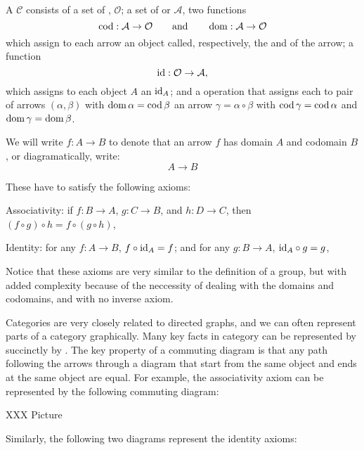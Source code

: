 \begin{definition}
  A  $\mathcal{C}$ consists of a set of
  , $\mathcal{O}$; a set of
   or  $\mathcal{A}$,
  two functions
  \[
    \operatorname{cod}: \mathcal{A} \to \mathcal{O} \qquad \text{and} \qquad \operatorname{dom}:
    \mathcal{A} \to \mathcal{O}
  \]
  which assign to each arrow an object called, respectively, the
   and  of the arrow; 
  a function
  \[
    \text{id}: \mathcal{O} \to \mathcal{A},
  \]
  which assigns to each object $A$ an  $\text{id}_{A}$; and a
   operation that assigns each to pair
  of arrows $(\alpha,\beta)$ with $\operatorname{dom} \alpha = \operatorname{cod} \beta$ an arrow
  $\gamma = \alpha \circ \beta$ with $\operatorname{cod} \gamma = \operatorname{cod} \alpha$ and
  $\operatorname{dom} \gamma = \operatorname{dom} \beta$.
  
  We will write $f : A \to B$ to denote that an arrow $f$ has domain 
  $A$ and codomain $B$, or diagramatically, write:
  \[
    A \to B
  \]
  
  These have to satisfy the following axioms:
  \begin{theoremenum}
    \item Associativity: if $f: B \to A$, $g: C \to B$, and $h: D \to
    C$, then $(f \circ g) \circ h = f \circ (g \circ h)$,
    
    \item Identity: for any $f : A \to B$, $f \circ \text{id}_{A} = f$; and
    for any $g: B \to A$, $\text{id}_{A} \circ g = g$,
  \end{theoremenum}
\end{definition}

Notice that these axioms are very similar to the definition of a 
group, but with added complexity because of the neccessity of dealing 
with the domains and codomains, and with no inverse axiom.

Categories are very closely related to directed graphs, and we can
often represent parts of a category graphically.  Many key facts in
category can be represented by succinctly by .  The key property of a commuting diagram 
is that any path following the arrows through a diagram that start 
from the same object and ends at the same object are equal.  For 
example, the associativity axiom can be represented by the following 
commuting diagram:

XXX Picture

Similarly, the following two diagrams represent the identity axioms:

